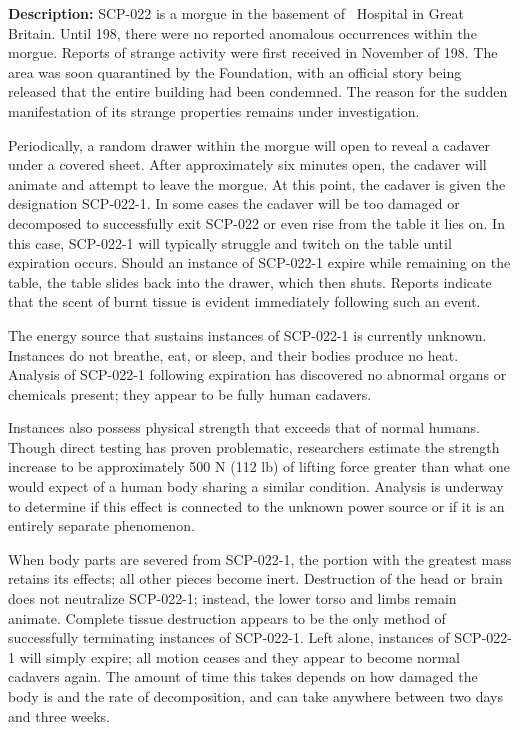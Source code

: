 \textbf{Description:} SCP-022 is a morgue in the basement of \redacted \ Hospital in Great Britain. Until 198, there were no reported anomalous occurrences within the morgue. Reports of strange activity were first received in November of 198. The area was soon quarantined by the Foundation, with an official story being released that the entire building had been condemned. The reason for the sudden manifestation of its strange properties remains under investigation.

Periodically, a random drawer within the morgue will open to reveal a cadaver under a covered sheet. After approximately six minutes open, the cadaver will animate and attempt to leave the morgue. At this point, the cadaver is given the designation SCP-022-1. In some cases the cadaver will be too damaged or decomposed to successfully exit SCP-022 or even rise from the table it lies on. In this case, SCP-022-1 will typically struggle and twitch on the table until expiration occurs. Should an instance of SCP-022-1 expire while remaining on the table, the table slides back into the drawer, which then shuts. Reports indicate that the scent of burnt tissue is evident immediately following such an event.

The energy source that sustains instances of SCP-022-1 is currently unknown. Instances do not breathe, eat, or sleep, and their bodies produce no heat. Analysis of SCP-022-1 following expiration has discovered no abnormal organs or chemicals present; they appear to be fully human cadavers.

Instances also possess physical strength that exceeds that of normal humans. Though direct testing has proven problematic, researchers estimate the strength increase to be approximately 500 N (112 lb) of lifting force greater than what one would expect of a human body sharing a similar condition. Analysis is underway to determine if this effect is connected to the unknown power source or if it is an entirely separate phenomenon.

When body parts are severed from SCP-022-1, the portion with the greatest mass retains its effects; all other pieces become inert. Destruction of the head or brain does not neutralize SCP-022-1; instead, the lower torso and limbs remain animate. Complete tissue destruction appears to be the only method of successfully terminating instances of SCP-022-1. Left alone, instances of SCP-022-1 will simply expire; all motion ceases and they appear to become normal cadavers again. The amount of time this takes depends on how damaged the body is and the rate of decomposition, and can take anywhere between two days and three weeks.


